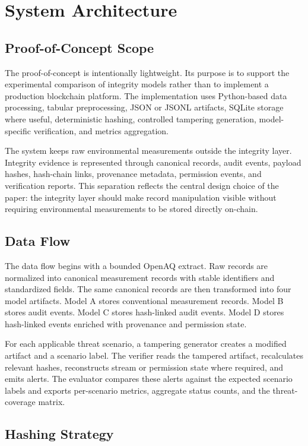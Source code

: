 \section{System Architecture}

\subsection{Proof-of-Concept Scope}

The proof-of-concept is intentionally lightweight. Its purpose is to support the experimental comparison of integrity models rather than to implement a production blockchain platform. The implementation uses Python-based data processing, tabular preprocessing, JSON or JSONL artifacts, SQLite storage where useful, deterministic hashing, controlled tampering generation, model-specific verification, and metrics aggregation.

The system keeps raw environmental measurements outside the integrity layer. Integrity evidence is represented through canonical records, audit events, payload hashes, hash-chain links, provenance metadata, permission events, and verification reports. This separation reflects the central design choice of the paper: the integrity layer should make record manipulation visible without requiring environmental measurements to be stored directly on-chain.

\subsection{Data Flow}

The data flow begins with a bounded OpenAQ extract. Raw records are normalized into canonical measurement records with stable identifiers and standardized fields. The same canonical records are then transformed into four model artifacts. Model A stores conventional measurement records. Model B stores audit events. Model C stores hash-linked audit events. Model D stores hash-linked events enriched with provenance and permission state.

For each applicable threat scenario, a tampering generator creates a modified artifact and a scenario label. The verifier reads the tampered artifact, recalculates relevant hashes, reconstructs stream or permission state where required, and emits alerts. The evaluator compares these alerts against the expected scenario labels and exports per-scenario metrics, aggregate status counts, and the threat-coverage matrix.

\subsection{Hashing Strategy}


